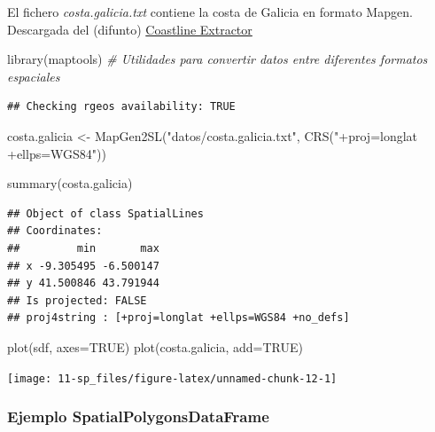 \documentclass[
  spanish,
]{book}
\newenvironment{Shaded}{\begin{snugshade}}{\end{snugshade}}
\newcommand{\AttributeTok}[1]{\textcolor[rgb]{0.77,0.63,0.00}{#1}}
\newcommand{\CommentTok}[1]{\textcolor[rgb]{0.56,0.35,0.01}{\textit{#1}}}
\newcommand{\ConstantTok}[1]{\textcolor[rgb]{0.00,0.00,0.00}{#1}}
\newcommand{\FunctionTok}[1]{\textcolor[rgb]{0.00,0.00,0.00}{#1}}
\newcommand{\NormalTok}[1]{#1}
\newcommand{\OtherTok}[1]{\textcolor[rgb]{0.56,0.35,0.01}{#1}}
\newcommand{\StringTok}[1]{\textcolor[rgb]{0.31,0.60,0.02}{#1}}
\theoremstyle{break}
\begin{document}
El fichero \emph{costa.galicia.txt} contiene la costa de Galicia en formato Mapgen.
Descargada del (difunto) \href{http://www.ngdc.noaa.gov/mgg/shorelines/shorelines.html}{Coastline Extractor}

\begin{Shaded}
\begin{Highlighting}[]
\FunctionTok{library}\NormalTok{(maptools) }\CommentTok{\# Utilidades para convertir datos entre diferentes formatos espaciales}
\end{Highlighting}
\end{Shaded}

\begin{verbatim}
## Checking rgeos availability: TRUE
\end{verbatim}

\begin{Shaded}
\begin{Highlighting}[]
\NormalTok{costa.galicia }\OtherTok{\textless{}{-}} \FunctionTok{MapGen2SL}\NormalTok{(}\StringTok{"datos/costa.galicia.txt"}\NormalTok{, }\FunctionTok{CRS}\NormalTok{(}\StringTok{"+proj=longlat +ellps=WGS84"}\NormalTok{))}

\FunctionTok{summary}\NormalTok{(costa.galicia)}
\end{Highlighting}
\end{Shaded}

\begin{verbatim}
## Object of class SpatialLines
## Coordinates:
##         min       max
## x -9.305495 -6.500147
## y 41.500846 43.791944
## Is projected: FALSE 
## proj4string : [+proj=longlat +ellps=WGS84 +no_defs]
\end{verbatim}

\begin{Shaded}
\begin{Highlighting}[]
\FunctionTok{plot}\NormalTok{(sdf, }\AttributeTok{axes=}\ConstantTok{TRUE}\NormalTok{)}
\FunctionTok{plot}\NormalTok{(costa.galicia, }\AttributeTok{add=}\ConstantTok{TRUE}\NormalTok{)}
\end{Highlighting}
\end{Shaded}

\begin{center}\texttt{[image: 11-sp\_files/figure-latex/unnamed-chunk-12-1]} \end{center}

\hypertarget{ejemplo-spatialpolygonsdataframe}{%
\subsubsection{Ejemplo SpatialPolygonsDataFrame}\label{ejemplo-spatialpolygonsdataframe}}
\end{document}
